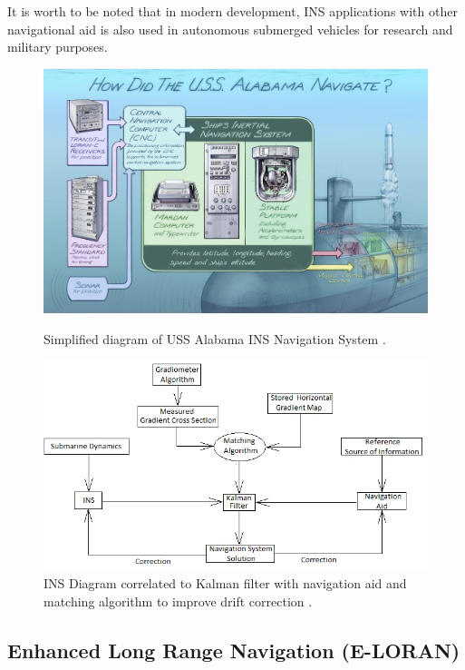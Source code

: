\noindent It is worth to be noted that in modern development, INS applications with other navigational aid is also used in autonomous submerged vehicles for research and military purposes.

\begin{figure}[!ht]
    \centering
    \includegraphics[scale=0.5]{Figures/USS_Alabama_INS.jpg}
    \caption{Simplified diagram of USS Alabama INS Navigation System \cite{HowNavigation}. }
    \label{fig:USS_INS}
    \vspace{2mm}
    \includegraphics[scale=0.7]{Figures/INS Scheme KALMAN filter.png}
    \caption{INS Diagram correlated to Kalman filter with navigation aid and matching algorithm to improve drift correction \cite{Rogobete2018UsingPositioning}. }
    \label{fig:INS_KALMAN}
\end{figure}
\vspace{3cm}

\subsection{Enhanced Long Range Navigation (E-LORAN)}

